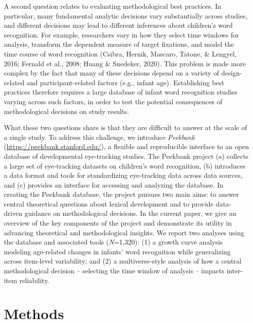 \documentclass[10pt, letterpaper]{article}
\begin{document}
A second question relates to evaluating methodological best practices.
In particular, many fundamental analytic decisions vary substantially
across studies, and different decisions may lead to different inferences
about children's word recognition. For example, researchers vary in how
they select time windows for analysis, transform the dependent measure
of target fixations, and model the time course of word recognition
(Csibra, Hernik, Mascaro, Tatone, \& Lengyel, 2016; Fernald et al.,
2008; Huang \& Snedeker, 2020). This problem is made more complex by the
fact that many of these decisions depend on a variety of design-related
and participant-related factors (e.g., infant age). Establishing best
practices therefore requires a large database of infant word recognition
studies varying across such factors, in order to test the potential
consequences of methodological decisions on study results.

What these two questions share is that they are difficult to answer at
the scale of a single study. To address this challenge, we introduce
\emph{Peekbank} (\url{https://peekbank.stanford.edu/}), a flexible and
reproducible interface to an open database of developmental eye-tracking
studies. The Peekbank project (a) collects a large set of eye-tracking
datasets on children's word recognition, (b) introduces a data format
and tools for standardizing eye-tracking data across data sources, and
(c) provides an interface for accessing and analyzing the database. In
creating the Peekbank database, the project pursues two main aims: to
answer central theoretical questions about lexical development and to
provide data-driven guidance on methodological decisions. In the current
paper, we give an overview of the key components of the project and
demonstrate its utility in advancing theoretical and methodological
insights. We report two analyses using the database and associated tools
(\emph{N}=1,320): (1) a growth curve analysis modeling age-related
changes in infants' word recognition while generalizing across
item-level variability; and (2) a multiverse-style analysis of how a
central methodological decision -- selecting the time window of analysis
-- impacts inter-item reliability.

\hypertarget{methods}{%
\section{Methods}\label{methods}}
\end{document}

